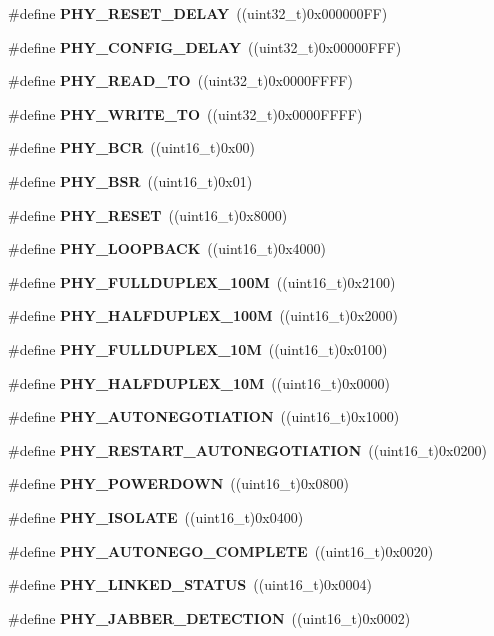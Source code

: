 \begin{DoxyCompactItemize}
\item 
\#define \textbf{ P\+H\+Y\+\_\+\+R\+E\+S\+E\+T\+\_\+\+D\+E\+L\+AY}~((uint32\+\_\+t)0x000000\+F\+F)
\item 
\#define \textbf{ P\+H\+Y\+\_\+\+C\+O\+N\+F\+I\+G\+\_\+\+D\+E\+L\+AY}~((uint32\+\_\+t)0x00000\+F\+F\+F)
\item 
\#define \textbf{ P\+H\+Y\+\_\+\+R\+E\+A\+D\+\_\+\+TO}~((uint32\+\_\+t)0x0000\+F\+F\+F\+F)
\item 
\#define \textbf{ P\+H\+Y\+\_\+\+W\+R\+I\+T\+E\+\_\+\+TO}~((uint32\+\_\+t)0x0000\+F\+F\+F\+F)
\item 
\#define \textbf{ P\+H\+Y\+\_\+\+B\+CR}~((uint16\+\_\+t)0x00)
\item 
\#define \textbf{ P\+H\+Y\+\_\+\+B\+SR}~((uint16\+\_\+t)0x01)
\item 
\#define \textbf{ P\+H\+Y\+\_\+\+R\+E\+S\+ET}~((uint16\+\_\+t)0x8000)
\item 
\#define \textbf{ P\+H\+Y\+\_\+\+L\+O\+O\+P\+B\+A\+CK}~((uint16\+\_\+t)0x4000)
\item 
\#define \textbf{ P\+H\+Y\+\_\+\+F\+U\+L\+L\+D\+U\+P\+L\+E\+X\+\_\+100M}~((uint16\+\_\+t)0x2100)
\item 
\#define \textbf{ P\+H\+Y\+\_\+\+H\+A\+L\+F\+D\+U\+P\+L\+E\+X\+\_\+100M}~((uint16\+\_\+t)0x2000)
\item 
\#define \textbf{ P\+H\+Y\+\_\+\+F\+U\+L\+L\+D\+U\+P\+L\+E\+X\+\_\+10M}~((uint16\+\_\+t)0x0100)
\item 
\#define \textbf{ P\+H\+Y\+\_\+\+H\+A\+L\+F\+D\+U\+P\+L\+E\+X\+\_\+10M}~((uint16\+\_\+t)0x0000)
\item 
\#define \textbf{ P\+H\+Y\+\_\+\+A\+U\+T\+O\+N\+E\+G\+O\+T\+I\+A\+T\+I\+ON}~((uint16\+\_\+t)0x1000)
\item 
\#define \textbf{ P\+H\+Y\+\_\+\+R\+E\+S\+T\+A\+R\+T\+\_\+\+A\+U\+T\+O\+N\+E\+G\+O\+T\+I\+A\+T\+I\+ON}~((uint16\+\_\+t)0x0200)
\item 
\#define \textbf{ P\+H\+Y\+\_\+\+P\+O\+W\+E\+R\+D\+O\+WN}~((uint16\+\_\+t)0x0800)
\item 
\#define \textbf{ P\+H\+Y\+\_\+\+I\+S\+O\+L\+A\+TE}~((uint16\+\_\+t)0x0400)
\item 
\#define \textbf{ P\+H\+Y\+\_\+\+A\+U\+T\+O\+N\+E\+G\+O\+\_\+\+C\+O\+M\+P\+L\+E\+TE}~((uint16\+\_\+t)0x0020)
\item 
\#define \textbf{ P\+H\+Y\+\_\+\+L\+I\+N\+K\+E\+D\+\_\+\+S\+T\+A\+T\+US}~((uint16\+\_\+t)0x0004)
\item 
\#define \textbf{ P\+H\+Y\+\_\+\+J\+A\+B\+B\+E\+R\+\_\+\+D\+E\+T\+E\+C\+T\+I\+ON}~((uint16\+\_\+t)0x0002)

\end{DoxyCompactItemize}
